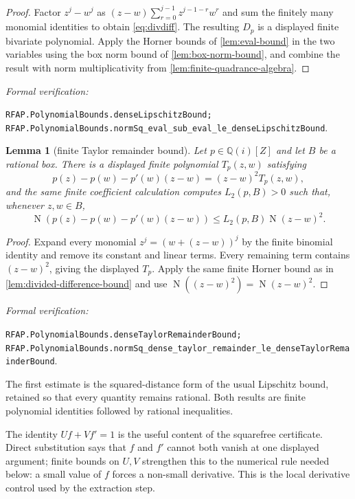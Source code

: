\documentclass[11pt]{article}
\newtheorem{lemma}[theorem]{Lemma}
\newcommand{\Qi}{\mathbb{Q}(i)}
\newcommand{\Norm}[1]{\operatorname{N}\!\left(#1\right)}
\newcommand{\leanref}[1]{\par\smallskip\noindent
  \emph{Formal verification:}\par\nobreak
  {\raggedright\nolinkurl{#1}.\par}}
\begin{document}
\begin{proof}
Factor $z^j-w^j$ as
$(z-w)\sum_{r=0}^{j-1}z^{j-1-r}w^r$ and sum the finitely many monomial
identities to obtain \eqref{eq:divdiff}.  The resulting $D_p$ is a displayed
finite bivariate polynomial.  Apply the Horner bounds of
\cref{lem:eval-bound} in the two variables using the box norm bound of
\cref{lem:box-norm-bound}, and combine the result with norm
multiplicativity from \cref{lem:finite-quadrance-algebra}.
\end{proof}

\leanref{RFAP.PolynomialBounds.denseLipschitzBound;
RFAP.PolynomialBounds.normSq_eval_sub_eval_le_denseLipschitzBound}

\begin{lemma}[finite Taylor remainder bound]
\label{lem:finite-taylor-bound}
Let $p\in\Qi[Z]$ and let $B$ be a rational box.  There is a displayed finite
polynomial $T_p(z,w)$ satisfying
\begin{equation}
\label{eq:taylor}
 p(z)-p(w)-p'(w)(z-w)=(z-w)^2T_p(z,w),
\end{equation}
and the same finite coefficient calculation computes $L_2(p,B)>0$ such
that, whenever $z,w\in B$,
\begin{equation}
\label{eq:lip2}
 \Norm{p(z)-p(w)-p'(w)(z-w)}
       \le L_2(p,B)\Norm{z-w}^2.
\end{equation}
\end{lemma}

\begin{proof}
Expand every monomial $z^j=(w+(z-w))^j$ by the finite binomial identity and
remove its constant and linear terms.  Every remaining term contains
$(z-w)^2$, giving the displayed $T_p$.  Apply the same finite Horner bound as
in \cref{lem:divided-difference-bound} and use
$\Norm{(z-w)^2}=\Norm{z-w}^2$.
\end{proof}

\leanref{RFAP.PolynomialBounds.denseTaylorRemainderBound;
RFAP.PolynomialBounds.normSq_dense_taylor_remainder_le_denseTaylorRemainderBound}

The first estimate is the squared-distance form of the usual Lipschitz
bound, retained so that every quantity remains rational.  Both results are
finite polynomial identities followed by rational inequalities.

The identity $Uf+Vf'=1$ is the useful content of the squarefree certificate.
Direct substitution says that $f$ and $f'$ cannot both vanish at one
displayed argument; finite bounds on $U,V$ strengthen this to the numerical
rule needed below: a small value of $f$ forces a non-small derivative.  This
is the local derivative control used by the extraction step.
\end{document}
